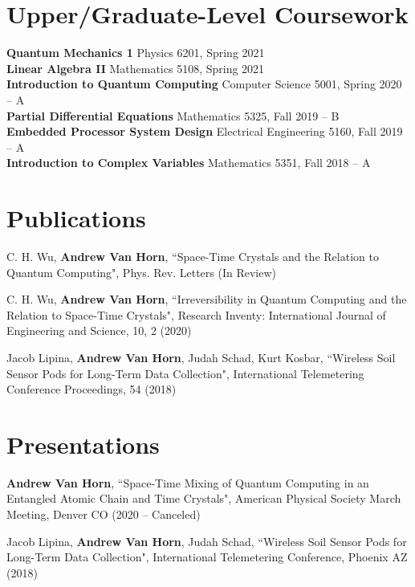 \documentclass[letterpaper,11pt]{article}
\begin{document}
\section{Upper/Graduate-Level Coursework}
\begin{itemize}[leftmargin=0.15in, label={}]
	\small{\item{
			\textbf{Quantum Mechanics 1}{ Physics 6201, Spring 2021} \\
			\textbf{Linear Algebra II}{ Mathematics 5108, Spring 2021}\\
			\textbf{Introduction to Quantum Computing}{ Computer Science 5001, Spring 2020 -- A} \\
			\textbf{Partial Differential Equations}{ Mathematics 5325, Fall 2019 -- B}\\
			\textbf{Embedded Processor System Design}{ Electrical Engineering 5160, Fall 2019 -- A}\\
			\textbf{Introduction to Complex Variables}{ Mathematics 5351, Fall 2018 -- A} \\
			
			
	}}
\end{itemize}

\section{Publications}
\begin{itemize}[leftmargin=0.15in, label={}]
	\small{\item{
			C. H. Wu, \textbf{Andrew Van Horn}, ``Space-Time Crystals and the Relation to Quantum Computing", Phys. Rev. Letters (In Review)
	}}
	\small{\item{
		C. H. Wu, \textbf{Andrew Van Horn}, ``Irreversibility in Quantum Computing and the Relation to Space-Time Crystals", Research Inventy: International Journal of Engineering and Science, 10, 2 (2020)
	}}
	\small{\item{
			Jacob Lipina, \textbf{Andrew Van Horn}, Judah Schad, Kurt Kosbar, ``Wireless Soil Sensor Pods for Long-Term Data Collection", International Telemetering Conference Proceedings, 54 (2018)
	}}
\end{itemize}	

\section{Presentations}
\begin{itemize}[leftmargin=0.15in, label={}]
	\small{\item{
			\textbf{Andrew Van Horn}, ``Space-Time Mixing of Quantum Computing in an Entangled Atomic Chain and Time Crystals", American Physical Society March Meeting, Denver CO (2020 -- Canceled)
	}}
	\small{\item{
			Jacob Lipina, \textbf{Andrew Van Horn}, Judah Schad, ``Wireless Soil Sensor Pods for Long-Term Data Collection", International Telemetering Conference, Phoenix AZ (2018)
	}}
\end{itemize}
\end{document}

